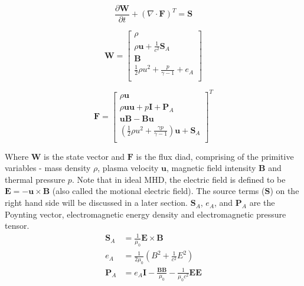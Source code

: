 \begin{equation}
    \frac{\partial \mathbf{W}}{\partial t} + \left(\nabla \cdot \mathbf{F} \right)^T = \mathbf{S}
\end{equation}

\begin{equation}
    \mathbf{W} = \left[ \begin{array}{c}
    \rho\\
    \rho \mathbf{u} + \frac{1}{c^2}\mathbf{S}_A\\ 
    \mathbf{B}     \\
    \frac{1}{2}\rho u^2 + \frac{p}{\gamma - 1} + e_A\\
    \end{array} \right]
\end{equation}


\begin{equation}
    \mathbf{F} = \left[ \begin{array}{c}
    \rho \mathbf{u}\\
    \rho \mathbf{u} \mathbf{u} + p\mathbf{I} + \mathbf{P}_A\\ 
    \mathbf{u}\mathbf{B} - \mathbf{B}\mathbf{u}\\
    \left(\frac{1}{2}\rho u^2 + \frac{\gamma p}{\gamma - 1}\right)\mathbf{u} + \mathbf{S}_A\\
    \end{array} \right]^T
\end{equation}

Where $\mathbf{W}$ is the state vector and $\mathbf{F}$ is the flux diad, comprising of the primitive variables - mass density $\rho$, plasma velocity $\mathbf{u}$, magnetic field intensity $\mathbf{B}$ and thermal pressure $p$. Note that in ideal MHD, the electric field is defined to be $\mathbf{E} = -\mathbf{u} \times \mathbf{B}$ (also called the motional electric field). The source terms ($\mathbf{S}$) on the right hand side will be discussed in a later section. $\mathbf{S}_A$, $e_A$, and $\mathbf{P}_A$ are the Poynting vector, electromagnetic energy density and electromagnetic pressure tensor.
\begin{align}
    \mathbf{S}_A & = \frac{1}{\mu_0} \mathbf{E} \times \mathbf{B}\\
    e_A &= \frac{1}{2\mu_0} \left( B^2 + \frac{1}{c^2} E^2\right)\\
    \mathbf{P}_A &= e_A \mathbf{I} - \frac{\mathbf{B}\mathbf{B}}{\mu_0} - \frac{1}{\mu_0 c^2}\mathbf{E}\mathbf{E}
\end{align}

